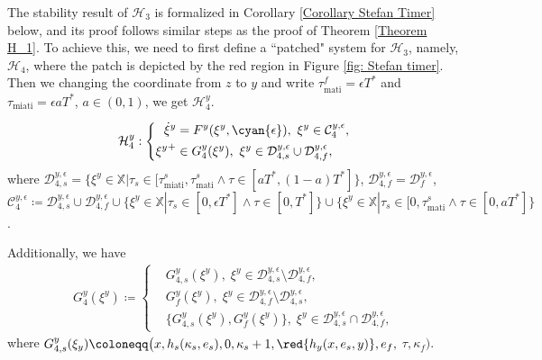 {The stability result of $\mathcal{H}_3$ is formalized in Corollary \ref{Corollary Stefan Timer} below, and its proof follows similar steps as the proof of Theorem \ref{Theorem H_1}. To achieve this, we need to first define a ``patched" system for $\mathcal{H}_3$, namely, $\mathcal{H}_4$, where the patch is depicted by the red region in Figure \ref{fig: Stefan timer}. Then we changing the coordinate from $z$ to $y$ and write $\tau_{\text{mati}}^f = \epsilon T^* $ and $\tau_{\text{miati}} = \epsilon aT^*$, $a \in (0,1)$, we get $\mathcal{H}_4^y$. 

\begin{equation}
    \mathcal{H}_4^y:\left\{
\begin{aligned}
    \dot{\xi}^y &= F^y(\xi^y, \cyan{\epsilon}),\ \xi^y \in \mathcal{C}_4^{y,\epsilon}, \\
    {\xi^y}^+ &\in G_4^y(\xi^y), \ \xi^y\in \mathcal{D}_{4,s}^{y,\epsilon} \cup \mathcal{D}_{4,f}^{y,\epsilon},
\end{aligned}
    \right.
    \label{eqn: H_4^y}
\end{equation}
where $\mathcal{D}_{4,s}^{y,\epsilon} = \{\xi^y \in \mathbb{X} | \tau_s \in [ \tau_{\text{miati}}^s, \tau_{\text{mati}}^s \wedge \tau \in [aT^*, (1-a)T^*] \}$, $\mathcal{D}_{4,f}^{y,\epsilon} = \mathcal{D}_f^{y,\epsilon}$,  $\mathcal{C}_4^{y,\epsilon}\coloneqq \mathcal{D}_{4,s}^{y,\epsilon} \cup \mathcal{D}_{4,f}^{y,\epsilon} \cup \{ \xi^y \in \mathbb{X} | \tau_s \in [0, \epsilon T^*] \wedge \tau \in [0, T^*]\} \cup  \{ \xi^y \in \mathbb{X} | \tau_s \in [0, \tau_{\text{mati}}^s \wedge \tau \in [0, aT^*]\} $.

Additionally, we have
\begin{align*}
    G_4^y(\xi^y) \coloneqq \left\{ 
    \begin{aligned}
    &G_{4,s}^y(\xi^y),  \;\xi^y\in\mathcal{D}_{4,s}^{y,\epsilon} \setminus \mathcal{D}_{4,f}^{y,\epsilon} , \\
    &G_f^y(\xi^y),  \;  \xi^y \in\mathcal{D}_{4,f}^{y,\epsilon} \setminus \mathcal{D}_{4,s}^{y,\epsilon} ,\\
    &\{G_{4,s}^y(\xi^y),G_f^y(\xi^y)\}, \; \xi^y\in \mathcal{D}_{4,s}^{y,\epsilon} \cap \mathcal{D}_{4,f}^{y,\epsilon},
    \end{aligned}
    \right. 
\end{align*}
where $G_{4,s}^y(\xi_y) \coloneqq \big(x, h_s(\kappa_s, e_s), 0, \kappa_s + 1, \red{h_y(x,e_s,y)},  e_f,$ $ \tau, \kappa_f \big)$. 





}
